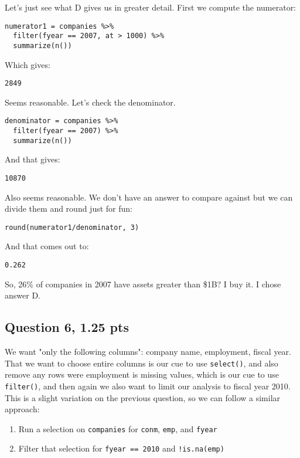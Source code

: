 \documentclass[11pt]{article}
\begin{document}
Let's just see what D gives us in greater detail.  First we compute the numerator:

\begin{verbatim}
numerator1 = companies %>%
  filter(fyear == 2007, at > 1000) %>%
  summarize(n())
\end{verbatim}

Which gives:

\begin{verbatim}
2849
\end{verbatim}


Seems reasonable.  Let's check the denominator.

\begin{verbatim}
denominator = companies %>%
  filter(fyear == 2007) %>%
  summarize(n())
\end{verbatim}

And that gives:

\begin{verbatim}
10870
\end{verbatim}


Also seems reasonable.  We don't have an answer to compare against but we can divide them and round just for fun:

\begin{verbatim}
round(numerator1/denominator, 3)
\end{verbatim}

And that comes out to:

\begin{verbatim}
0.262
\end{verbatim}


So, 26\% of companies in 2007 have assets greater than \$1B?  I buy it.  I chose answer D.

\subsection*{Question 6, 1.25 pts}
\label{sec:org1488dab}
We want "only the following columns": company name, employment, fiscal year.  That we want to choose entire columns is our cue to use \texttt{select()}, and also remove any rows were employment is missing values, which is our cue to use \texttt{filter()}, and then again we also want to limit our analysis to fiscal year 2010.  This is a slight variation on the previous question, so we can follow a similar approach:

\begin{enumerate}
\item Run a selection on \texttt{companies} for \texttt{conm}, \texttt{emp}, and \texttt{fyear}
\item Filter that selection for \texttt{fyear == 2010} and \texttt{!is.na(emp)}
\end{enumerate}
\end{document}
